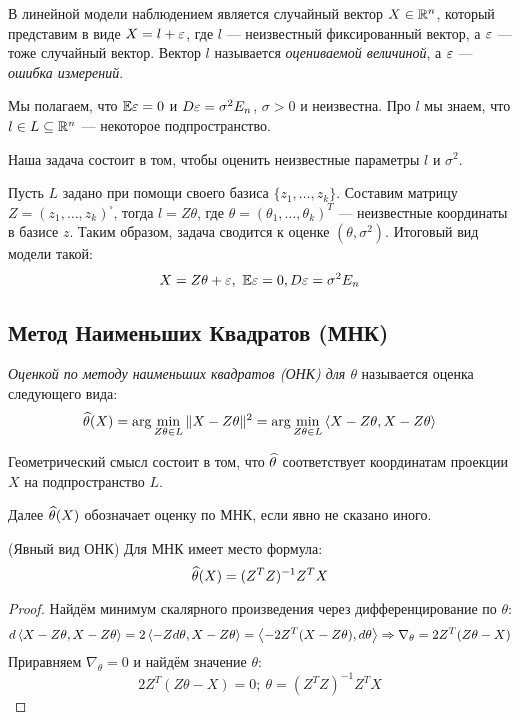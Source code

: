 \begin{note}
	В линейной модели наблюдением является случайный вектор $X \in \mathbb{R}^n$, который представим в виде $X = l + \varepsilon$, где $l$ --- неизвестный фиксированный вектор, а $\varepsilon$ --- тоже случайный вектор. Вектор $l$ называется \textit{оцениваемой величиной}, а $\varepsilon$ --- \textit{ошибка измерений}.
	
	Мы полагаем, что $\mathbb{E} \varepsilon = 0$ и $D\varepsilon = \sigma^2 E_n$, $\sigma > 0$ и неизвестна. Про $l$ мы знаем, что $l \in L \subseteq \mathbb{R}^n$ --- некоторое подпространство.
	
	Наша задача состоит в том, чтобы оценить неизвестные параметры $l$ и $\sigma^2$.
	
	Пусть $L$ задано при помощи своего базиса $\{z_1, \ldots, z_k\}$. Составим матрицу $Z = (z_1, \ldots, z_k)^\square$, тогда $l = Z\theta$, где $\theta = (\theta_1, \ldots, \theta_k)^T$ --- неизвестные координаты в базисе $z$. Таким образом, задача сводится к оценке $(\theta, \sigma^2)$. Итоговый вид модели такой:
	\[
		X = Z\theta + \varepsilon,\ \mathbb{E} \varepsilon = 0, D\varepsilon = \sigma^2 E_n
	\]
\end{note}

\subsection{Метод Наименьших Квадратов (МНК)}

\begin{definition}
	\textit{Оценкой по методу наименьших квадратов (ОНК) для $\theta$} называется оценка следующего вида:
	\[
		\widehat{\theta}(X) = \arg\min_{Z\theta \in L} \|X - Z\theta\|^2 = \arg\min_{Z\theta \in L} \left\langle X - Z\theta, X - Z\theta\right\rangle
	\]
\end{definition}

\begin{note}
	Геометрический смысл состоит в том, что $\widehat{\theta}$ соответствует координатам проекции $X$ на подпространство $L$.
\end{note}

\begin{note}
	Далее $\widehat{\theta}(X)$ обозначает оценку по МНК, если явно не сказано иного.
\end{note}

\begin{lemma} (Явный вид ОНК)
	Для МНК имеет место формула:
	\[
		\widehat{\theta}(X) = (Z^TZ)^{-1}Z^TX
	\]
\end{lemma}

\begin{proof}
	Найдём минимум скалярного произведения через дифференцирование по $\theta$:
	\[
		d\left\langle X- Z\theta, X - Z\theta\right\rangle = 2\left\langle-Zd\theta, X - Z\theta\right\rangle = \left\langle-2Z^T(X - Z\theta), d\theta\right\rangle \Rightarrow \nabla_\theta = 2Z^T(Z\theta - X)
	\]
	Приравняем $\nabla_\theta = 0$ и найдём значение $\theta$:
	\[
		2Z^T(Z\theta - X) = 0;\ \theta = (Z^TZ)^{-1}Z^TX
	\]
\end{proof}

